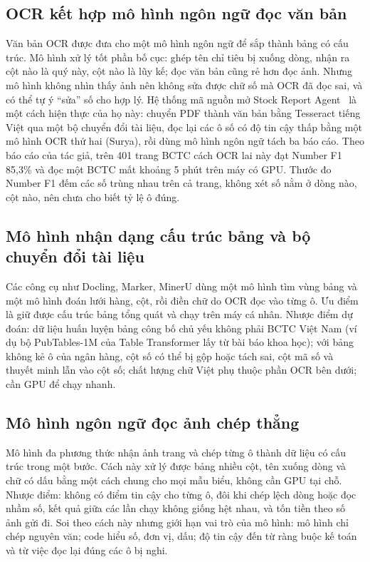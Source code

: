 \documentclass[12pt,a4paper]{report}
\newcommand{\enquote}[1]{“#1”}
\begin{document}
\subsection{OCR kết hợp mô hình ngôn ngữ đọc văn bản}
Văn bản OCR được đưa cho một mô hình ngôn ngữ để sắp thành bảng có cấu trúc. Mô hình xử lý tốt phần bố cục: ghép tên chỉ
tiêu bị xuống dòng, nhận ra cột nào là quý này, cột nào là lũy kế; đọc văn bản cũng rẻ hơn đọc ảnh. Nhưng mô hình không
nhìn thấy ảnh nên không sửa được chữ số mà OCR đã đọc sai, và có thể tự ý \enquote{sửa} số cho hợp lý. Hệ thống mã nguồn
mở Stock Report Agent~\cite{prevcohort} là một cách hiện thực của họ này: chuyển PDF thành văn bản bằng Tesseract tiếng
Việt qua một bộ chuyển đổi tài liệu, đọc lại các ô số có độ tin cậy thấp bằng một mô hình OCR thứ hai (Surya), rồi dùng mô
hình ngôn ngữ tách ba báo cáo. Theo báo cáo của tác giả, trên 401 trang BCTC cách OCR lai này đạt Number F1 85,3\% và đọc
một BCTC mất khoảng 5 phút trên máy có GPU. Thước đo Number F1 đếm các số trùng nhau trên cả trang, không xét số nằm ở dòng
nào, cột nào, nên chưa cho biết tỷ lệ ô đúng.

\subsection{Mô hình nhận dạng cấu trúc bảng và bộ chuyển đổi tài liệu}
Các công cụ như Docling, Marker, MinerU dùng một mô hình tìm vùng bảng và một mô hình đoán lưới hàng, cột, rồi điền chữ do
OCR đọc vào từng ô. Ưu điểm là giữ được cấu trúc bảng tổng quát và chạy trên máy cá nhân. Nhược điểm dự đoán: dữ liệu
huấn luyện bảng công bố chủ yếu không phải BCTC Việt Nam (ví dụ bộ PubTables-1M của Table Transformer lấy từ bài báo khoa
học); với bảng không kẻ ô của ngân hàng, cột số có thể bị gộp hoặc tách sai, cột mã số và thuyết minh lẫn vào cột số;
chất lượng chữ Việt phụ thuộc phần OCR bên dưới; cần GPU để chạy nhanh.

\subsection{Mô hình ngôn ngữ đọc ảnh chép thẳng}
Mô hình đa phương thức nhận ảnh trang và chép từng ô thành dữ liệu có cấu trúc trong một bước. Cách này xử lý được bảng
nhiều cột, tên xuống dòng và chữ có dấu bằng một cách chung cho mọi mẫu biểu, không cần GPU tại chỗ. Nhược điểm: không có
điểm tin cậy cho từng ô, đôi khi chép lệch dòng hoặc đọc nhầm số, kết quả giữa các lần chạy không giống hệt nhau, và tốn
tiền theo số ảnh gửi đi. Soi theo cách này nhưng giới hạn vai trò của mô hình: mô hình chỉ chép nguyên văn; code hiểu số,
đơn vị, dấu; độ tin cậy đến từ ràng buộc kế toán và từ việc đọc lại đúng các ô bị nghi.
\end{document}
